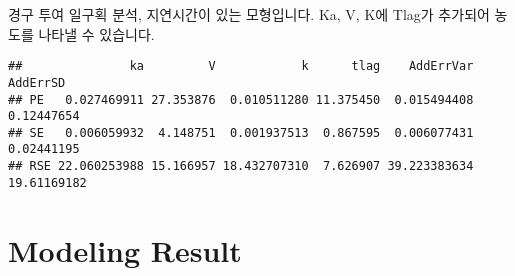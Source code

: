 \documentclass[9pt,]{krantz}
\newenvironment{Shaded}{\begin{snugshade}}{\end{snugshade}}
\newcommand{\KeywordTok}[1]{\textcolor[rgb]{0.13,0.29,0.53}{\textbf{#1}}}
\newcommand{\DataTypeTok}[1]{\textcolor[rgb]{0.13,0.29,0.53}{#1}}
\newcommand{\DecValTok}[1]{\textcolor[rgb]{0.00,0.00,0.81}{#1}}
\newcommand{\FloatTok}[1]{\textcolor[rgb]{0.00,0.00,0.81}{#1}}
\newcommand{\StringTok}[1]{\textcolor[rgb]{0.31,0.60,0.02}{#1}}
\newcommand{\CommentTok}[1]{\textcolor[rgb]{0.56,0.35,0.01}{\textit{#1}}}
\newcommand{\ControlFlowTok}[1]{\textcolor[rgb]{0.13,0.29,0.53}{\textbf{#1}}}
\newcommand{\OperatorTok}[1]{\textcolor[rgb]{0.81,0.36,0.00}{\textbf{#1}}}
\newcommand{\NormalTok}[1]{#1}
\begin{document}
경구 투여 일구획 분석, 지연시간이 있는 모형입니다. Ka, V, K에 Tlag가
추가되어 농도를 나타낼 수 있습니다.

\begin{Shaded}
\end{Shaded}

\begin{verbatim}
##               ka         V            k      tlag    AddErrVar    AddErrSD
## PE   0.027469911 27.353876  0.010511280 11.375450  0.015494408  0.12447654
## SE   0.006059932  4.148751  0.001937513  0.867595  0.006077431  0.02441195
## RSE 22.060253988 15.166957 18.432707310  7.626907 39.223383634 19.61169182
\end{verbatim}

\section{Modeling Result}\label{modeling-result}
\end{document}
